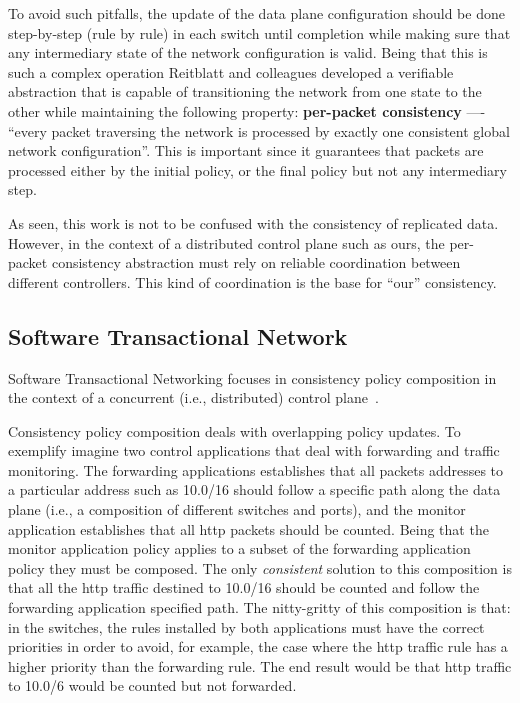 To avoid such pitfalls, the update of the data plane configuration should be done  step-by-step (rule by rule)  in each switch until completion while making sure that any intermediary state of the  network configuration is valid. 
Being that this is such a complex operation Reitblatt and colleagues developed a verifiable abstraction that is capable of transitioning the network from one state to the other while maintaining the following property: \textbf{per-packet consistency} ---- ``every packet traversing the network is processed by exactly one consistent global network configuration''.  This is important since it guarantees that packets are processed either by the initial policy, or the final policy but not any intermediary step. 

As seen, this work is not to be confused with the consistency of replicated data. 
However, in the context of a distributed control plane such as ours, the per-packet consistency abstraction must rely on reliable coordination between different controllers. This kind of coordination is the base for ``our'' consistency. 

\subsection{Software Transactional Network}
Software Transactional Networking focuses in consistency policy composition in the context of a concurrent (i.e., distributed) control plane~\cite{Canini:2013:HotSDN:STN}. 

Consistency policy composition deals with overlapping policy updates. 
To exemplify imagine two control applications that deal with forwarding and traffic monitoring. 
The forwarding applications establishes that all packets addresses to a particular address such as 10.0/16  should follow a specific path along the data plane (i.e., a composition of different switches and ports), and the monitor application establishes that all \gls{http} packets should be counted. 
Being that the monitor application policy applies to a subset of the forwarding application policy they must be composed. 
The only \emph{consistent} solution to this  composition is that all the  \gls{http} traffic destined to 10.0/16  should be counted and follow the forwarding application specified path. 
The nitty-gritty of this composition is that: in the switches, the rules installed by both applications must have the correct priorities in order to avoid, for example, the case where the  \gls{http} traffic rule has a higher priority than the forwarding rule. 
The end result would be that http traffic to 10.0/6 would be counted but not forwarded. 

